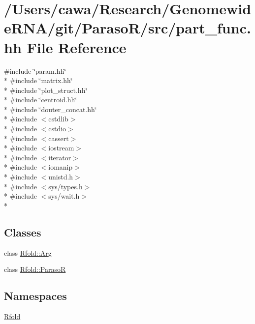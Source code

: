 \hypertarget{part__func_8hh}{\section{/\+Users/cawa/\+Research/\+Genomewide\+R\+N\+A/git/\+Paraso\+R/src/part\+\_\+func.hh File Reference}
\label{part__func_8hh}
}
{\ttfamily \#include \char`\"{}param.\+hh\char`\"{}}\\*
{\ttfamily \#include \char`\"{}matrix.\+hh\char`\"{}}\\*
{\ttfamily \#include \char`\"{}plot\+\_\+struct.\+hh\char`\"{}}\\*
{\ttfamily \#include \char`\"{}centroid.\+hh\char`\"{}}\\*
{\ttfamily \#include \char`\"{}douter\+\_\+concat.\+hh\char`\"{}}\\*
{\ttfamily \#include $<$cstdlib$>$}\\*
{\ttfamily \#include $<$cstdio$>$}\\*
{\ttfamily \#include $<$cassert$>$}\\*
{\ttfamily \#include $<$iostream$>$}\\*
{\ttfamily \#include $<$iterator$>$}\\*
{\ttfamily \#include $<$iomanip$>$}\\*
{\ttfamily \#include $<$unistd.\+h$>$}\\*
{\ttfamily \#include $<$sys/types.\+h$>$}\\*
{\ttfamily \#include $<$sys/wait.\+h$>$}\\*
\subsection*{Classes}
\begin{DoxyCompactItemize}
\item 
class \hyperlink{class_rfold_1_1_arg}{Rfold\+::\+Arg}
\item 
class \hyperlink{class_rfold_1_1_paraso_r}{Rfold\+::\+Paraso\+R}
\end{DoxyCompactItemize}
\subsection*{Namespaces}
\begin{DoxyCompactItemize}
\item 
 \hyperlink{namespace_rfold}{Rfold}
\end{DoxyCompactItemize}
